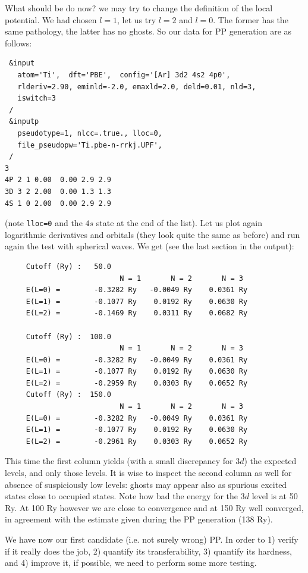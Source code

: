 \documentclass[12pt,a4paper]{article}
\begin{document}
What should be do now? we may try to change the definition of the
local potential. We had chosen $l=1$, let us try $l=2$ and $l=0$.
The former has the same pathology, the latter has no ghosts.
So our data for PP generation are as follows:
\begin{verbatim}
 &input
   atom='Ti',  dft='PBE',  config='[Ar] 3d2 4s2 4p0',
   rlderiv=2.90, eminld=-2.0, emaxld=2.0, deld=0.01, nld=3,
   iswitch=3
 /
 &inputp
   pseudotype=1, nlcc=.true., lloc=0,
   file_pseudopw='Ti.pbe-n-rrkj.UPF',
 /
3
4P 2 1 0.00  0.00 2.9 2.9
3D 3 2 2.00  0.00 1.3 1.3
4S 1 0 2.00  0.00 2.9 2.9
\end{verbatim}
(note \texttt{lloc=0} and the $4s$ state at the end of the list). 
Let us plot again logarithmic derivatives and orbitals (they look 
quite the same as before) and run again the test with spherical 
waves. We get (see the last section in the output):
\begin{verbatim}
     Cutoff (Ry) :   50.0
                           N = 1       N = 2       N = 3
     E(L=0) =        -0.3282 Ry   -0.0049 Ry    0.0361 Ry
     E(L=1) =        -0.1077 Ry    0.0192 Ry    0.0630 Ry
     E(L=2) =        -0.1469 Ry    0.0311 Ry    0.0682 Ry

     Cutoff (Ry) :  100.0
                           N = 1       N = 2       N = 3
     E(L=0) =        -0.3282 Ry   -0.0049 Ry    0.0361 Ry
     E(L=1) =        -0.1077 Ry    0.0192 Ry    0.0630 Ry
     E(L=2) =        -0.2959 Ry    0.0303 Ry    0.0652 Ry
     Cutoff (Ry) :  150.0
                           N = 1       N = 2       N = 3
     E(L=0) =        -0.3282 Ry   -0.0049 Ry    0.0361 Ry
     E(L=1) =        -0.1077 Ry    0.0192 Ry    0.0630 Ry
     E(L=2) =        -0.2961 Ry    0.0303 Ry    0.0652 Ry
\end{verbatim}
This time the first column yields (with a small discrepancy for $3d$)
the expected levels, and only those levels. It is wise to inspect
the second column as well for absence of suspiciously low levels: 
ghosts may appear also as spurious excited states close to occupied
states. Note how bad the energy for the $3d$ level is at 50 Ry.
At 100 Ry however we are close to convergence and at 150 Ry 
well converged, in agreement with the estimate given during 
the PP generation (138 Ry).

We have now our first candidate (i.e. not surely wrong) PP. 
In order to 1) verify if it really does the job, 2) quantify
its transferability, 3) quantify its hardness, and 4) improve 
it, if possible, we need to perform some more testing.
\end{document}

